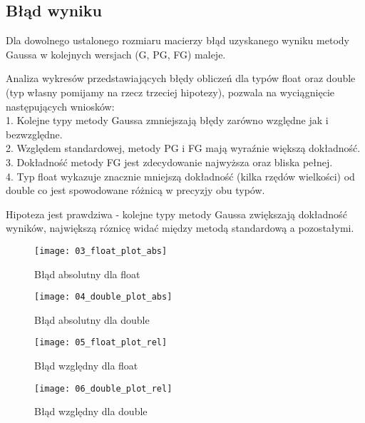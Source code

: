 \documentclass[10pt]{article}
\newenvironment{hypothesis}[2][Hipoteza]{\begin{trivlist}
\item[\hskip \labelsep {\bfseries #1}\hskip \labelsep {\bfseries #2.}]}{\end{trivlist}}
\newenvironment{corollary}[2][Wniosek]{\begin{trivlist}
\item[\hskip \labelsep {\bfseries #1}\hskip \labelsep {\bfseries #2.}]}{\end{trivlist}}
\begin{document}
\subsection{Błąd wyniku}
\begin{hypothesis}{2}
Dla dowolnego ustalonego rozmiaru macierzy błąd uzyskanego wyniku metody Gaussa w kolejnych wersjach (G, PG, FG) maleje.\end{hypothesis}
Analiza wykresów przedstawiających błędy obliczeń dla typów float oraz double (typ własny pomijamy na rzecz trzeciej hipotezy), pozwala na wyciągnięcie następujących wniosków: \\
1. Kolejne typy metody Gaussa zmniejszają błędy zarówno względne jak i bezwzględne.\\
2. Względem standardowej, metody PG i FG mają wyraźnie większą dokładność.\\
3. Dokładność metody FG jest zdecydowanie najwyższa oraz bliska pełnej.\\
4. Typ float wykazuje znacznie mniejszą dokładność (kilka rzędów wielkości) od double co jest spowodowane różnicą w precyzjy obu typów.\\
\begin{corollary}{2}
Hipoteza jest prawdziwa - kolejne typy metody Gaussa zwiększają dokładność wyników, największą róznicę widać między metodą standardową a pozostałymi.
\end{corollary}

\begin{figure}[!htb]
   \begin{minipage}{0.48\textwidth}
     \centering
     \texttt{[image: 03\_float\_plot\_abs]}
     \caption{Błąd absolutny dla float}\label{Fig:Data1}
   \end{minipage}\hfill
   \begin{minipage}{0.48\textwidth}
     \centering
     \texttt{[image: 04\_double\_plot\_abs]}
     \caption{Błąd absolutny dla double}\label{Fig:Data2}
   \end{minipage}
\end{figure}
\begin{figure}[!htb]
   \begin{minipage}{0.48\textwidth}
     \centering
     \texttt{[image: 05\_float\_plot\_rel]}
     \caption{Błąd względny dla float}\label{Fig:Data1}
   \end{minipage}\hfill
   \begin{minipage}{0.48\textwidth}
     \centering
     \texttt{[image: 06\_double\_plot\_rel]}
     \caption{Błąd względny dla double}\label{Fig:Data2}
   \end{minipage}
\end{figure}
\end{document}
